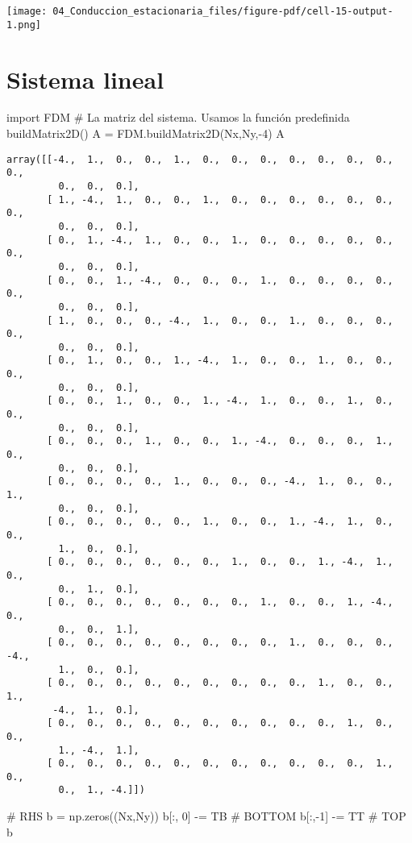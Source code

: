 \documentclass[
  letterpaper,
  DIV=11,
  numbers=noendperiod]{scrreprt}
\newenvironment{Shaded}{\begin{snugshade}}{\end{snugshade}}
\newcommand{\CommentTok}[1]{\textcolor[rgb]{0.37,0.37,0.37}{#1}}
\newcommand{\DecValTok}[1]{\textcolor[rgb]{0.68,0.00,0.00}{#1}}
\newcommand{\ImportTok}[1]{\textcolor[rgb]{0.00,0.46,0.62}{#1}}
\newcommand{\NormalTok}[1]{\textcolor[rgb]{0.00,0.23,0.31}{#1}}
\newcommand{\OperatorTok}[1]{\textcolor[rgb]{0.37,0.37,0.37}{#1}}
\begin{document}
\texttt{[image: 04\_Conduccion\_estacionaria\_files/figure-pdf/cell-15-output-1.png]}

\section{Sistema lineal}\label{sistema-lineal}

\begin{Shaded}
\begin{Highlighting}[]
\ImportTok{import}\NormalTok{ FDM}
\CommentTok{\# La matriz del sistema. Usamos la función predefinida buildMatrix2D()}
\NormalTok{A }\OperatorTok{=}\NormalTok{ FDM.buildMatrix2D(Nx,Ny,}\OperatorTok{{-}}\DecValTok{4}\NormalTok{)}
\NormalTok{A}
\end{Highlighting}
\end{Shaded}

\begin{verbatim}
array([[-4.,  1.,  0.,  0.,  1.,  0.,  0.,  0.,  0.,  0.,  0.,  0.,  0.,
         0.,  0.,  0.],
       [ 1., -4.,  1.,  0.,  0.,  1.,  0.,  0.,  0.,  0.,  0.,  0.,  0.,
         0.,  0.,  0.],
       [ 0.,  1., -4.,  1.,  0.,  0.,  1.,  0.,  0.,  0.,  0.,  0.,  0.,
         0.,  0.,  0.],
       [ 0.,  0.,  1., -4.,  0.,  0.,  0.,  1.,  0.,  0.,  0.,  0.,  0.,
         0.,  0.,  0.],
       [ 1.,  0.,  0.,  0., -4.,  1.,  0.,  0.,  1.,  0.,  0.,  0.,  0.,
         0.,  0.,  0.],
       [ 0.,  1.,  0.,  0.,  1., -4.,  1.,  0.,  0.,  1.,  0.,  0.,  0.,
         0.,  0.,  0.],
       [ 0.,  0.,  1.,  0.,  0.,  1., -4.,  1.,  0.,  0.,  1.,  0.,  0.,
         0.,  0.,  0.],
       [ 0.,  0.,  0.,  1.,  0.,  0.,  1., -4.,  0.,  0.,  0.,  1.,  0.,
         0.,  0.,  0.],
       [ 0.,  0.,  0.,  0.,  1.,  0.,  0.,  0., -4.,  1.,  0.,  0.,  1.,
         0.,  0.,  0.],
       [ 0.,  0.,  0.,  0.,  0.,  1.,  0.,  0.,  1., -4.,  1.,  0.,  0.,
         1.,  0.,  0.],
       [ 0.,  0.,  0.,  0.,  0.,  0.,  1.,  0.,  0.,  1., -4.,  1.,  0.,
         0.,  1.,  0.],
       [ 0.,  0.,  0.,  0.,  0.,  0.,  0.,  1.,  0.,  0.,  1., -4.,  0.,
         0.,  0.,  1.],
       [ 0.,  0.,  0.,  0.,  0.,  0.,  0.,  0.,  1.,  0.,  0.,  0., -4.,
         1.,  0.,  0.],
       [ 0.,  0.,  0.,  0.,  0.,  0.,  0.,  0.,  0.,  1.,  0.,  0.,  1.,
        -4.,  1.,  0.],
       [ 0.,  0.,  0.,  0.,  0.,  0.,  0.,  0.,  0.,  0.,  1.,  0.,  0.,
         1., -4.,  1.],
       [ 0.,  0.,  0.,  0.,  0.,  0.,  0.,  0.,  0.,  0.,  0.,  1.,  0.,
         0.,  1., -4.]])
\end{verbatim}

\begin{Shaded}
\begin{Highlighting}[]
\CommentTok{\# RHS}
\NormalTok{b }\OperatorTok{=}\NormalTok{ np.zeros((Nx,Ny))}
\NormalTok{b[:, }\DecValTok{0}\NormalTok{] }\OperatorTok{{-}=}\NormalTok{ TB  }\CommentTok{\# BOTTOM}
\NormalTok{b[:,}\OperatorTok{{-}}\DecValTok{1}\NormalTok{] }\OperatorTok{{-}=}\NormalTok{ TT  }\CommentTok{\# TOP}
\NormalTok{b}
\end{Highlighting}
\end{Shaded}
\end{document}
